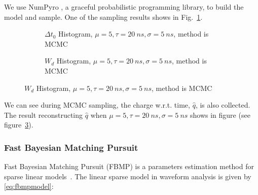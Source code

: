 We use NumPyro \cite{phan2019composable}, a graceful probabilistic programming library, to build the model and sample. One of the sampling results shows in Fig.~\ref{fig:mcmcrec-t0hist}. 

\begin{figure}[H]
\begin{minipage}[t]{.5\textwidth}
\begin{figure}[H]
    \centering
    \resizebox{\textwidth}{!}{}
    \caption{\label{fig:mcmcrec-t0hist} $\Delta t_{0}$ Histogram, $\mu=5, \tau=\SI{20}{ns}, \sigma=\SI{5}{ns}$, method is MCMC}
\end{figure}
\end{minipage}
\begin{minipage}[t]{.5\textwidth}
\begin{figure}[H]
    \centering
    \resizebox{\textwidth}{!}{}
    \caption{\label{fig:mcmcrec-chargehist} $W_{d}$ Histogram, $\mu=5, \tau=\SI{20}{ns}, \sigma=\SI{5}{ns}$, method is MCMC}
\end{figure}
\end{minipage}
\end{figure}

We can see during MCMC sampling, the charge w.r.t. time, $\hat{q}$, is also collected. The result reconstructing $\hat{q}$ when $\mu=5, \tau=\SI{20}{ns}, \sigma=\SI{5}{ns}$ shows in figure (see figure~\ref{fig:mcmcrec-chargehist}). 

\subsubsection{Fast Bayesian Matching Pursuit}

Fast Bayesian Matching Pursuit (FBMP) is a parameters estimation method for sparse linear models~\cite{schniter_fast_nodate}. The linear sparse model in waveform analysis is given by \eqref{eq:fbmpmodel}: 

